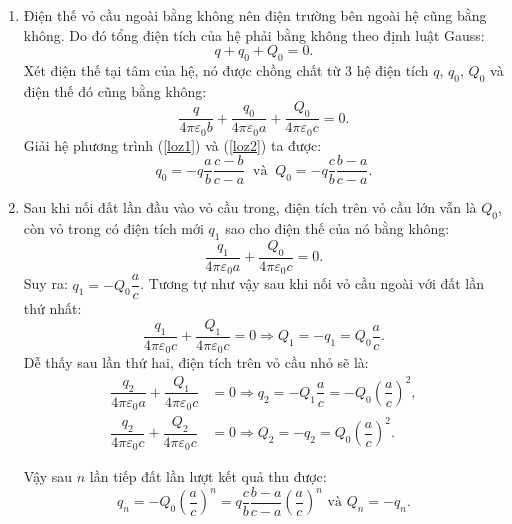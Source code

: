 \begin{loigiai}
\begin{enumerate}[1)]
    \item Điện thế vỏ cầu ngoài bằng không nên điện trường bên ngoài hệ cũng bằng không. Do đó tổng điện tích của hệ phải bằng không theo định luật Gauss:
    \[
q+q_{0}+Q_{0}=0. \tag{1} \label{loz1}
\]
Xét điện thế tại tâm của hệ, nó được chồng chất từ 3 hệ điện tích $q$, $q_0$, $Q_0$ và điện thế đó cũng bằng không:
\[
\dfrac{q}{4 \pi \varepsilon_{0} b}+\dfrac{q_{0}}{4 \pi \varepsilon_{0} a}+\dfrac{Q_{0}}{4 \pi \varepsilon_{0} c}=0. \tag{2} \label{loz2}
\]
Giải hệ phương trình (\ref{loz1}) và (\ref{loz2}) ta được:
$$
q_{0}=-q \dfrac{a}{b} \dfrac{c-b}{c-a} \  \text { và } \ Q_{0}=-q \dfrac{c}{b} \dfrac{b-a}{c-a}.
$$
\item Sau khi nối đất lần đầu vào vỏ cầu trong, điện tích trên vỏ cầu lớn vẫn là $Q_0$, còn vỏ trong có điện tích mới $q_1$ sao cho điện thế của nó bằng không:
$$
\dfrac{q_{1}}{4 \pi \varepsilon_{0} a}+\dfrac{Q_{0}}{4 \pi \varepsilon_{0} c}=0.
$$
Suy ra: $q_1=-Q_0\dfrac{a}{c}$.
Tương tự như vậy sau khi nối vỏ cầu ngoài với đất lần thứ nhất:
$$
\dfrac{q_{1}}{4 \pi \varepsilon_{0} c}+\dfrac{Q_{1}}{4 \pi \varepsilon_{0} c}=0 \Rightarrow  Q_{1}=-q_{1}=Q_{0} \dfrac{a}{c}.
$$
Dễ thấy sau lần thứ hai, điện tích trên vỏ cầu nhỏ sẽ là:
\[\begin{aligned}  
\dfrac{q_{2}}{4 \pi \varepsilon_{0} a}+\dfrac{Q_{1}}{4 \pi \varepsilon_{0} c} &= 0 \Rightarrow q_{2} = -Q_{1} \dfrac{a}{c}=-Q_{0}\left(\dfrac{a}{c}\right)^{2}, \\
\dfrac{q_{2}}{4 \pi \varepsilon_{0} c}+\dfrac{Q_{2}}{4 \pi \varepsilon_{0} c} &= 0 \Rightarrow  Q_{2} = -q_{2}=Q_{0}\left(\dfrac{a}{c}\right)^{2}.
\end{aligned}\]

Vậy sau $n$ lần tiếp đất lần lượt kết quả thu được:
$$
q_{n}=-Q_{0}\left(\dfrac{a}{c}\right)^{n}=q \dfrac{c}{b} \dfrac{b-a}{c-a}\left(\dfrac{a}{c}\right)^{n} \text { và } Q_{n}=-q_{n}.
$$
\end{enumerate}
\end{loigiai}



